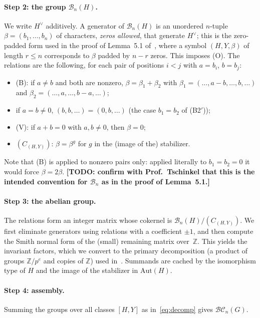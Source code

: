 \documentclass[11pt]{article}
\newcommand{\todo}[1]{\textbf{[TODO: #1]}}
\newcommand{\BC}{\mathcal{BC}}   %
\newcommand{\B}{\mathcal{B}}     %
\newcommand{\Z}{\mathbb{Z}}
\newcommand{\dual}[1]{#1^{\vee}}
\begin{document}
\paragraph{Step 2: the group $\B_n(H)$.}
We write $\dual{H}$ additively. A generator of $\B_n(H)$ is an unordered $n$-tuple
$\beta=(b_1,\dots,b_n)$ of characters, \emph{zeros allowed}, that generate $\dual{H}$; this
is the zero-padded form used in the proof of Lemma~5.1 of~\cite{TYZ}, where a symbol
$(H,Y,\beta)$ of length $r\le n$ corresponds to $\beta$ padded by $n-r$ zeros. This
imposes (O). The relations are the following, for each pair of positions $i<j$ with
$a=b_i$, $b=b_j$:
\begin{itemize}
  \item (B): if $a\ne b$ and both are nonzero, $\beta=\beta_1+\beta_2$ with
        $\beta_1=(\dots,a-b,\dots,b,\dots)$ and $\beta_2=(\dots,a,\dots,b-a,\dots)$;
  \item if $a=b\neq 0$, $(b,b,\dots)=(0,b,\dots)$ (the case $b_1=b_2$ of (B2$'$));
  \item (V): if $a+b=0$ with $a,b\ne 0$, then $\beta=0$;
  \item $(C_{(H,Y)})$: $\beta=\beta^g$ for $g$ in the (image of the) stabilizer.
\end{itemize}
Note that (B) is applied to nonzero pairs only: applied literally to $b_1=b_2=0$ it would force
$\beta=2\beta$. \todo{confirm with Prof.\ Tschinkel that this is the intended convention
for $\B_n$ as in the proof of Lemma~5.1.}

\paragraph{Step 3: the abelian group.}
The relations form an integer matrix whose cokernel is $\B_n(H)/(C_{(H,Y)})$. We first
eliminate generators using relations with a coefficient $\pm1$, and then compute the Smith
normal form of the (small) remaining matrix over~$\Z$. This yields the invariant factors,
which we convert to the primary decomposition (a product of groups $\Z/p^e$ and copies of $\Z$) used in~\cite{TYZ}.
Summands are cached by the isomorphism type of $H$ and the image of the stabilizer in
$\mathrm{Aut}(H)$.

\paragraph{Step 4: assembly.}
Summing the groups over all classes $[H,Y]$ as in~\eqref{eq:decomp} gives $\BC_n(G)$.
\end{document}

